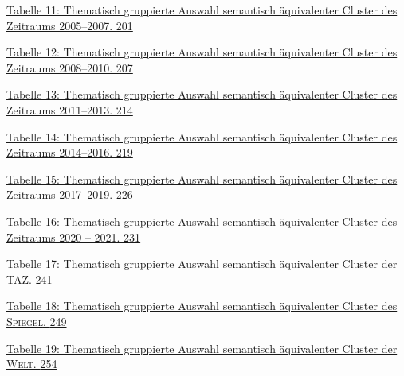 \hyperref[_Ref162017417]{Tabelle 11: Thematisch gruppierte Auswahl semantisch äquivalenter Cluster des Zeitraums 2005--2007. \hyperref[_Ref162017417]{201}}

\hyperref[_Toc162477804]{Tabelle 12: Thematisch gruppierte Auswahl semantisch äquivalenter Cluster des Zeitraums 2008--2010. \hyperref[_Toc162477804]{207}}

\hyperref[_Toc162477805]{Tabelle 13: Thematisch gruppierte Auswahl semantisch äquivalenter Cluster des Zeitraums 2011--2013. \hyperref[_Toc162477805]{214}}

\hyperref[_Toc162477806]{Tabelle 14: Thematisch gruppierte Auswahl semantisch äquivalenter Cluster des Zeitraums 2014--2016. \hyperref[_Toc162477806]{219}}

\hyperref[_Toc162477807]{Tabelle 15: Thematisch gruppierte Auswahl semantisch äquivalenter Cluster des Zeitraums 2017--2019. \hyperref[_Toc162477807]{226}}

\hyperref[_Toc162477808]{Tabelle 16: Thematisch gruppierte Auswahl semantisch äquivalenter Cluster des Zeitraums 2020 -- 2021. \hyperref[_Toc162477808]{231}}

\hyperref[_Ref162017445]{Tabelle 17: Thematisch gruppierte Auswahl semantisch äquivalenter Cluster der \textsc{TAZ}. \hyperref[_Ref162017445]{241}}

\hyperref[_Toc162477810]{Tabelle 18: Thematisch gruppierte Auswahl semantisch äquivalenter Cluster des \textsc{Spiegel}. \hyperref[_Toc162477810]{249}}

\hyperref[_Toc162477811]{Tabelle 19: Thematisch gruppierte Auswahl semantisch äquivalenter Cluster der \textsc{Welt}. \hyperref[_Toc162477811]{254}}